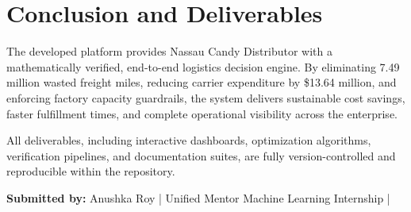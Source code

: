 \documentclass[12pt]{article}
\begin{document}
\section{Conclusion and Deliverables}
The developed platform provides Nassau Candy Distributor with a mathematically verified, end-to-end logistics decision engine. By eliminating 7.49 million wasted freight miles, reducing carrier expenditure by \$13.64 million, and enforcing factory capacity guardrails, the system delivers sustainable cost savings, faster fulfillment times, and complete operational visibility across the enterprise.

All deliverables, including interactive dashboards, optimization algorithms, verification pipelines, and documentation suites, are fully version-controlled and reproducible within the repository.

\vspace{30pt}
\textbf{Submitted by:} Anushka Roy \quad | \quad Unified Mentor Machine Learning Internship \quad | 
\end{document}
